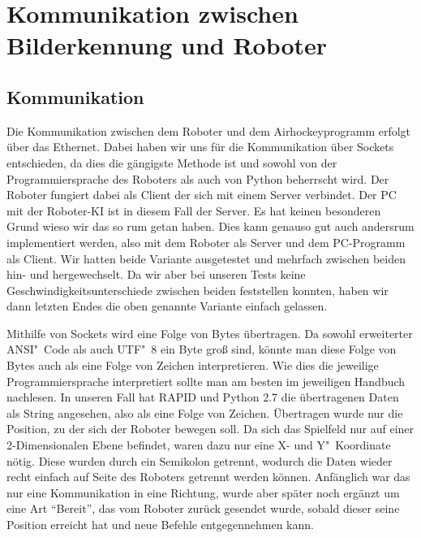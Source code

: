 
\chapter{Kommunikation zwischen Bilderkennung und Roboter}
\label{cha:Kommunikation zwischen Bilderkennung und Roboter}
\section{Kommunikation}
Die Kommunikation zwischen dem Roboter und dem Airhockeyprogramm erfolgt über das Ethernet. Dabei haben wir uns für die Kommunikation über Sockets entschieden, da dies die gängigste Methode ist und sowohl von der Programmiersprache des Roboters als auch von Python beherrscht wird. Der Roboter fungiert dabei als Client der sich mit einem Server verbindet. Der PC mit der Roboter-KI ist in diesem Fall der Server. Es hat keinen besonderen Grund wieso wir das so rum getan haben. Dies kann genauso gut auch andersrum implementiert werden, also mit dem Roboter als Server und dem PC-Programm als Client. Wir hatten beide Variante ausgetestet und mehrfach zwischen beiden hin- und hergewechselt. Da wir aber bei unseren Tests keine Geschwindigkeitsunterschiede zwischen beiden feststellen konnten, haben wir dann letzten Endes die oben genannte Variante einfach gelassen.

Mithilfe von Sockets wird eine Folge von Bytes übertragen. Da sowohl erweiterter ANSI"~Code als auch UTF"~8 ein Byte groß sind, könnte man diese Folge von Bytes auch als eine Folge von Zeichen interpretieren. Wie dies die jeweilige Programmiersprache interpretiert sollte man am besten im jeweiligen Handbuch nachlesen. In unseren Fall hat RAPID und Python 2.7 die übertragenen Daten als String angesehen, also als eine Folge von Zeichen. 
Übertragen wurde nur die Position, zu der sich der Roboter bewegen soll.  Da sich das Spielfeld nur auf einer 2-Dimensionalen Ebene befindet, waren dazu nur eine X- und Y"~Koordinate nötig. Diese wurden durch ein Semikolon getrennt, wodurch die Daten wieder recht einfach auf Seite des Roboters getrennt werden können. Anfänglich war das nur eine Kommunikation in eine Richtung, wurde aber später noch ergänzt um eine Art \enquote{Bereit}, das vom Roboter zurück gesendet wurde, sobald dieser seine Position erreicht hat und neue Befehle entgegennehmen kann. 

